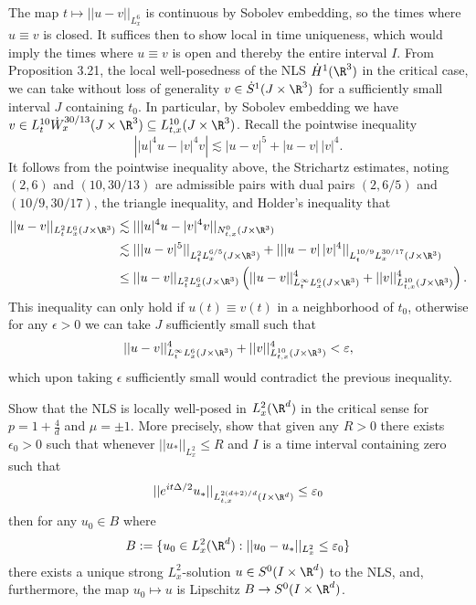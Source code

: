 \begin{solution}
	The map $t \mapsto ||u - v||_{L^6_x}$ is continuous by Sobolev embedding, so the times where $u \equiv v$ is closed. It suffices then to show local in time uniqueness, which would imply the times where $u \equiv v$ is open and thereby the entire interval $I$. From Proposition 3.21, the local well-posedness of the NLS $\dot H^1 (\R^3)$ in the critical case, we can take without loss of generality $v \in \dot S^1 (J \times \R^3)$ for a sufficiently small interval $J$ containing $t_0$. In particular, by Sobolev embedding we have $v \in L^{10}_t \dot W^{30/13}_x (J \times \R^3) \subseteq L^{10}_{t, x} (J \times \R^3)$. Recall the pointwise inequality
		\[ \left| |u|^4 u - |v|^4 v\right| \lesssim |u - v|^5 + |u - v| \, |v|^4.\]	
	It follows from the pointwise inequality above, the Strichartz estimates, noting $(2, 6)$ and $(10, 30/13)$ are admissible pairs with dual pairs $(2, 6/5)$ and $(10/9, 30/17)$, the triangle inequality, and Holder's inequality that	
	\begin{align*}
		||u - v||_{L^2_t L^6_x (J \times \R^3)} 
			&\lesssim ||  |u|^4 u - |v|^4 v ||_{N^{0}_{t, x} (J \times \R^3)} \\
			&\lesssim || |u - v|^5 ||_{L^{2}_t L^{6/5}_x (J \times \R^3)} + || |u - v| \, |v|^4 ||_{L^{10/9}_t L^{30/17}_x (J \times \R^3)} \\
			&\leq || u - v||_{L^2_t L^6_x (J \times \R^3)} \left( ||u - v||^4_{L^{\infty}_{t}L^6_x (J \times \R^3)} + ||v||_{L^{10}_{t, x} (J \times \R^3)}^4 \right).
	\end{align*}
	This inequality can only hold if $u (t) \equiv v (t)$ in a neighborhood of $t_0$, otherwise for any $\epsilon > 0$ we can take $J$ sufficiently small such that 
		\[ ||u - v||^4_{L^{\infty}_{t}L^6_x (J \times \R^3)} + ||v||_{L^{10}_{t, x} (J \times \R^3)}^4 < \epsilon, \]
	which upon taking $\epsilon$ sufficiently small would contradict the previous inequality. 	
\end{solution}


\begin{statement}
	Show that the NLS is locally well-posed in $L^2_x (\R^d)$ in the critical sense for $p = 1 + \tfrac4d$ and $\mu = \pm 1$. More precisely, show that given any $R > 0$ there exists $\epsilon_0 > 0$ such that whenever $||u_*||_{L^2_x} \leq R$ and $I$ is a time interval containing zero such that 
		\[ ||e^{i t\Delta/2} u_*||_{L^{2(d + 2)/d}_{t, x} (I \times \R^d)} \leq \epsilon_0 \]
	then for any $u_0 \in B$ where
		\[ B:= \{u_0 \in L^2_x (\R^d) : ||u_0 - u_*||_{L^2_x} \leq \epsilon_0\} \]	
	there exists a unique strong $L^2_x$-solution $u \in S^0 (I \times \R^d)$ to the NLS, and, furthermore, the map $u_0 \mapsto u$ is Lipschitz $B \to S^0 (I \times \R^d)$. 
\end{statement}

